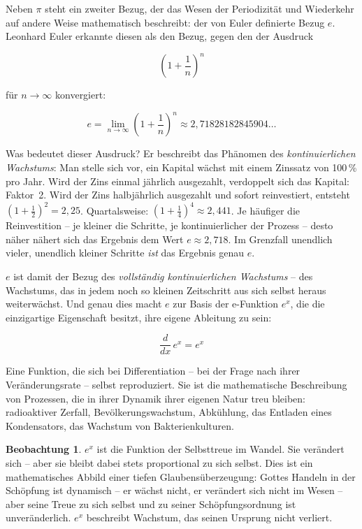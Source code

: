 ﻿\documentclass[a4paper,12pt]{article}
\theoremstyle{definition}
\newtheorem{observation}{Beobachtung}[section]
\begin{document}
Neben $\pi$ steht ein zweiter Bezug, der das Wesen der Periodizität
und Wiederkehr auf andere Weise mathematisch beschreibt: der von Euler definierte Bezug $e$.
Leonhard Euler erkannte diesen als den Bezug, gegen den der Ausdruck

\begin{equation}
	\left(1 + \frac{1}{n}\right)^n
\end{equation}

für $n \to \infty$ konvergiert:

\begin{equation}
	e = \lim_{n \to \infty} \left(1 + \frac{1}{n}\right)^n \approx
	2{,}71828182845904\ldots
\end{equation}

Was bedeutet dieser Ausdruck? Er beschreibt das Phänomen des \textit{kontinuierlichen
	Wachstums}: Man stelle sich vor, ein Kapital wächst mit einem Zinssatz von 100\,\%
pro Jahr. Wird der Zins einmal jährlich ausgezahlt, verdoppelt sich das Kapital:
Faktor~2. Wird der Zins halbjährlich ausgezahlt und sofort reinvestiert, entsteht
$\left(1{+}\tfrac{1}{2}\right)^2 = 2{,}25$. Quartalsweise: $\left(1{+}
\tfrac{1}{4}\right)^4 \approx 2{,}441$. Je häufiger die Reinvestition --
je kleiner die Schritte, je kontinuierlicher der Prozess -- desto näher nähert
sich das Ergebnis dem Wert $e \approx 2{,}718$. Im Grenzfall unendlich vieler,
unendlich kleiner Schritte \textit{ist} das Ergebnis genau $e$.

$e$ ist damit der Bezug des \textit{vollständig kontinuierlichen Wachstums} --
des Wachstums, das in jedem noch so kleinen Zeitschritt aus sich selbst heraus
weiter\-wächst. Und genau dies macht $e$ zur Basis der e-Funktion $e^x$, die die einzigartige Eigenschaft besitzt, ihre eigene Ableitung zu sein:

\begin{equation}
	\frac{d}{dx}\, e^x = e^x
\end{equation}

Eine Funktion, die sich bei Differentiation -- bei der Frage nach ihrer
Veränderungsrate -- selbst reproduziert. Sie ist die mathematische Beschreibung
von Prozessen, die in ihrer Dynamik ihrer eigenen Natur treu bleiben: radioaktiver
Zerfall, Bevölkerungswachstum, Abkühlung, das Entladen eines Kondensators,
das Wachstum von Bakterienkulturen.

\begin{observation}
	$e^{x}$ ist die Funktion der Selbsttreue im Wandel. Sie verändert sich --
	aber sie bleibt dabei stets proportional zu sich selbst. Dies ist ein mathematisches
	Abbild einer tiefen Glaubensüberzeugung: Gottes Handeln in der Schöpfung
	ist dynamisch -- er wächst nicht, er verändert sich nicht im Wesen -- aber
	seine Treue zu sich selbst und zu seiner Schöpfungsordnung ist unveränderlich.
	$e^{x}$ beschreibt Wachstum, das seinen Ursprung nicht verliert.
\end{observation}
\end{document}

